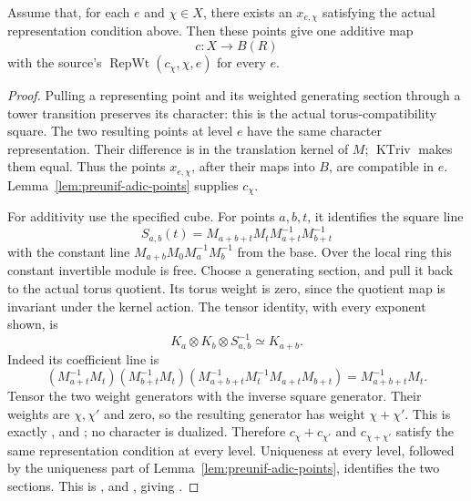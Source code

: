 \begin{srproposition}
\label{prop:preunif-additive-weights}
Assume that, for each \(e\) and \(\chi\in X\), there exists an
\(x_{e,\chi}\) satisfying the actual representation condition above.
Then these points give one additive map
\[
                         c:X\longrightarrow B(R)
\]
with the source's \(\operatorname{RepWt}(c_\chi,\chi,e)\)
for every \(e\).
\end{srproposition}
\begin{proof}
Pulling a representing point and its weighted generating section
through a tower transition preserves its character: this is the
actual torus-compatibility square.  The two resulting points at
level \(e\) have the same character representation.
Their difference is in the translation kernel of \(M\);
\(\operatorname{KTriv}\) makes them equal.
Thus the points \(x_{e,\chi}\), after their maps into \(B\), are
compatible in \(e\).  Lemma~\ref{lem:preunif-adic-points} supplies
\(c_\chi\).

For additivity use the specified cube.  For points \(a,b,t\), it
identifies the square line
\[
          S_{a,b}(t)
               =M_{a+b+t}M_tM_{a+t}^{-1}M_{b+t}^{-1}
\]
with the constant line \(M_{a+b}M_0M_a^{-1}M_b^{-1}\) from the
base.  Over the local ring this constant invertible module is
free.  Choose a generating section, and pull it back to the
actual torus quotient.  Its torus weight is zero, since the
quotient map is invariant under the kernel action.
The tensor identity, with every exponent shown, is
\[
                    K_a\otimes K_b\otimes S_{a,b}^{-1}
                                \simeq K_{a+b}.
\]
Indeed its coefficient line is
\[
 (M_{a+t}^{-1}M_t)(M_{b+t}^{-1}M_t)
       (M_{a+b+t}^{-1}M_t^{-1}M_{a+t}M_{b+t})
                    =M_{a+b+t}^{-1}M_t .
\]
Tensor the two weight generators with the inverse square generator.
Their weights are \(\chi,\chi'\) and zero, so the resulting
generator has weight \(\chi+\chi'\). This is exactly
,  and
; no character is dualized.
Therefore \(c_\chi+c_{\chi'}\) and \(c_{\chi+\chi'}\) satisfy the
same representation condition at every level.
Uniqueness at every level, followed by the uniqueness part of
Lemma~\ref{lem:preunif-adic-points}, identifies the two sections.
This is ,  and
, giving .
\end{proof}

